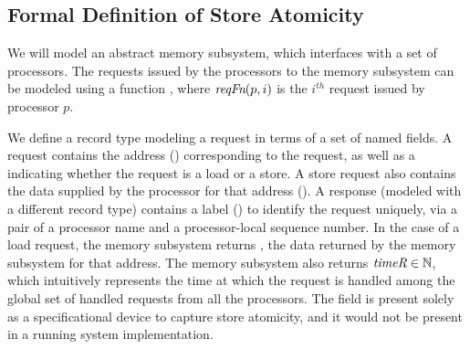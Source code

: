 \subsection{Formal Definition of Store Atomicity}
We will model an abstract memory subsystem, which interfaces with a set of
processors. The requests issued by the processors to the memory subsystem can
be modeled using a function \reqFn, where $\textit{reqFn}(p, i)$ is the $i^{th}$ request
issued by processor $p$.


We define a record type modeling a request in terms of a set of named fields.
A request contains the address (\addrQ) corresponding to the request, as well as a
\desc{} indicating whether the request is a load or a store. A store request
also contains the data supplied by the processor for that address (\dataQ). A
response (modeled with a different record type) contains a label ()
to identify the request uniquely, via a pair of a processor name and a processor-local
sequence number.  In the case of a load request, the memory
subsystem returns \dataR, the data returned by the memory subsystem for that
address. The memory subsystem also returns $\textit{timeR} \in \mathbb{N}$, which
intuitively represents the time at which the request is handled among the
global set of handled requests from all the processors. The \timeR{} field is
present solely as a specificational device to capture store atomicity, and it
would not be present in a running system implementation.


